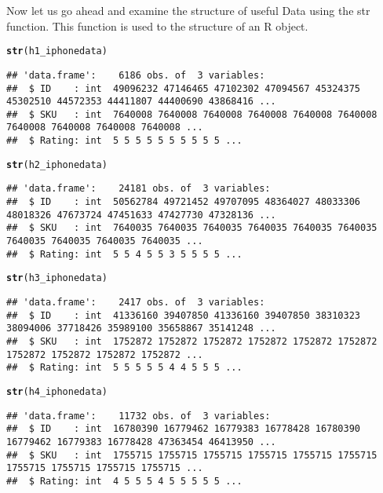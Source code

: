 \documentclass{article}\usepackage[]{graphicx}\usepackage[]{color}
\makeatletter
\newcommand{\hlstd}[1]{\textcolor[rgb]{0.345,0.345,0.345}{#1}}%
\newcommand{\hlkwd}[1]{\textcolor[rgb]{0.737,0.353,0.396}{\textbf{#1}}}%
\newenvironment{kframe}{%
 \def\at@end@of@kframe{}%
 \ifinner\ifhmode%
  \def\at@end@of@kframe{\end{minipage}}%
  \begin{minipage}{\columnwidth}%
 \fi\fi%
 \def\FrameCommand##1{\hskip\@totalleftmargin \hskip-\fboxsep
 \colorbox{shadecolor}{##1}\hskip-\fboxsep
     \hskip-\linewidth \hskip-\@totalleftmargin \hskip\columnwidth}%
 \MakeFramed {\advance\hsize-\width
   \@totalleftmargin\z@ \linewidth\hsize
   \@setminipage}}%
 {\par\unskip\endMakeFramed%
 \at@end@of@kframe}
\newenvironment{knitrout}{}{} %
\makeatother
\begin{document}
Now let us go ahead and examine the structure of  useful Data using the str function.
This function is used to the structure of an R object.
\begin{knitrout}
\color{fgcolor}\begin{kframe}
\begin{alltt}
\hlkwd{str}\hlstd{(h1_iphonedata)}
\end{alltt}
\begin{verbatim}
## 'data.frame':	6186 obs. of  3 variables:
##  $ ID    : int  49096232 47146465 47102302 47094567 45324375 45302510 44572353 44411807 44400690 43868416 ...
##  $ SKU   : int  7640008 7640008 7640008 7640008 7640008 7640008 7640008 7640008 7640008 7640008 ...
##  $ Rating: int  5 5 5 5 5 5 5 5 5 5 ...
\end{verbatim}
\begin{alltt}
\hlkwd{str}\hlstd{(h2_iphonedata)}
\end{alltt}
\begin{verbatim}
## 'data.frame':	24181 obs. of  3 variables:
##  $ ID    : int  50562784 49721452 49707095 48364027 48033306 48018326 47673724 47451633 47427730 47328136 ...
##  $ SKU   : int  7640035 7640035 7640035 7640035 7640035 7640035 7640035 7640035 7640035 7640035 ...
##  $ Rating: int  5 5 4 5 5 3 5 5 5 5 ...
\end{verbatim}
\begin{alltt}
\hlkwd{str}\hlstd{(h3_iphonedata)}
\end{alltt}
\begin{verbatim}
## 'data.frame':	2417 obs. of  3 variables:
##  $ ID    : int  41336160 39407850 41336160 39407850 38310323 38094006 37718426 35989100 35658867 35141248 ...
##  $ SKU   : int  1752872 1752872 1752872 1752872 1752872 1752872 1752872 1752872 1752872 1752872 ...
##  $ Rating: int  5 5 5 5 5 4 4 5 5 5 ...
\end{verbatim}
\begin{alltt}
\hlkwd{str}\hlstd{(h4_iphonedata)}
\end{alltt}
\begin{verbatim}
## 'data.frame':	11732 obs. of  3 variables:
##  $ ID    : int  16780390 16779462 16779383 16778428 16780390 16779462 16779383 16778428 47363454 46413950 ...
##  $ SKU   : int  1755715 1755715 1755715 1755715 1755715 1755715 1755715 1755715 1755715 1755715 ...
##  $ Rating: int  4 5 5 5 4 5 5 5 5 5 ...
\end{verbatim}
\end{kframe}
\end{knitrout}
\end{document}

